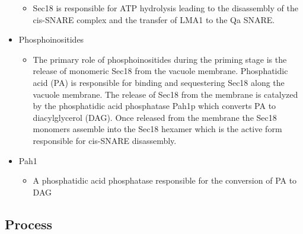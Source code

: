 \documentclass[12pt,twoside]{reedthesis}
\providecommand{\tightlist}{%
  \setlength{\itemsep}{0pt}\setlength{\parskip}{0pt}}
\begin{document}
\begin{itemize}
  \begin{itemize}
  \tightlist
  \item
    Sec18 is responsible for ATP hydrolysis leading to the disassembly of the cis-SNARE complex and the transfer of LMA1 to the Qa SNARE.
  \end{itemize}
\item
  Phosphoinositides

  \begin{itemize}
  \tightlist
  \item
    The primary role of phosphoinositides during the priming stage is the release of monomeric Sec18 from the vacuole membrane. Phosphatidic acid (PA) is responsible for binding and sequestering Sec18 along the vacuole membrane. The release of Sec18 from the membrane is catalyzed by the phosphatidic acid phosphatase Pah1p which converts PA to diacylglycerol (DAG). Once released from the membrane the Sec18 monomers assemble into the Sec18 hexamer which is the active form responsible for cis-SNARE disassembly.
  \end{itemize}
\item
  Pah1

  \begin{itemize}
  \tightlist
  \item
    A phosphatidic acid phosphatase responsible for the conversion of PA to DAG
  \end{itemize}
\end{itemize}

\subsection{Process}\label{process}
\end{document}
